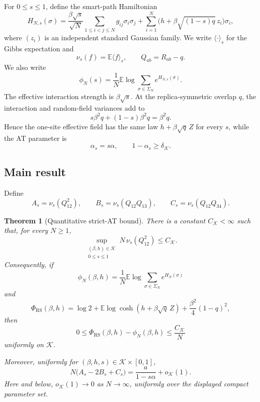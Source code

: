 \documentclass[11pt]{article}
\numberwithin{equation}{section}
\theoremstyle{plain}
\newtheorem{theorem}{Theorem}[section]
\theoremstyle{definition}
\newcommand{\E}{\mathbb E}
\newcommand{\1}{\mathbf 1}
\newcommand{\RS}{\mathrm{RS}}
\newcommand{\cK}{\mathcal K}
\begin{document}
For $0\le s\le1$, define the smart-path Hamiltonian
\begin{equation}
 H_{N,s}(\sigma)
 =
 \frac{\beta\sqrt s}{\sqrt N}
 \sum_{1\le i<j\le N}g_{ij}\sigma_i\sigma_j
 +\sum_{i=1}^N
 \bigl(h+\beta\sqrt{(1-s)q}\,z_i\bigr)\sigma_i,
 \label{eq:path}
\end{equation}
where $(z_i)$ is an independent standard Gaussian family.  We write
$\langle\cdot\rangle_s$ for the Gibbs expectation and
\[
 \nu_s(f)=\E\langle f\rangle_s,\qquad Q_{ab}=R_{ab}-q.
\]
We also write
\begin{equation}
 \phi_N(s)=\frac1N\E\log
 \sum_{\sigma\in\Sigma_N}e^{H_{N,s}(\sigma)}.
 \label{eq:pathfreeenergy}
\end{equation}
The effective interaction strength is $\beta\sqrt s$.  At the
replica-symmetric overlap $q$, the interaction and random-field
variances add to
\begin{equation}
 s\beta^2q+(1-s)\beta^2q=\beta^2q.
 \label{eq:constantvariance}
\end{equation}
Hence the one-site effective field has the same law
$h+\beta\sqrt q\,Z$ for every $s$, while the AT parameter is
\begin{equation}
 \alpha_s=s\alpha,\qquad 1-\alpha_s\ge\delta_{\cK}.
 \label{eq:alphas}
\end{equation}

\subsection{Main result}

Define
\begin{equation}
 A_s=\nu_s(Q_{12}^2),\qquad
 B_s=\nu_s(Q_{12}Q_{13}),\qquad
 C_s=\nu_s(Q_{12}Q_{34}).
 \label{eq:ABC}
\end{equation}

\begin{theorem}[Quantitative strict-AT bound]
\label{thm:main}
There is a constant $C_{\cK}<\infty$ such that, for every $N\ge1$,
\[
 \sup_{\substack{(\beta,h)\in\cK\\0\le s\le1}}
 N\,\nu_s(Q_{12}^2)\le C_{\cK}.
\]
Consequently, if
\[
 \phi_N(\beta,h)=\frac1N\E\log\sum_{\sigma\in\Sigma_N}e^{H_N(\sigma)}
\]
and
\[
 \Phi_{\RS}(\beta,h)
 =
 \log2+\E\log\cosh(h+\beta\sqrt q\,Z)
 +\frac{\beta^2}{4}(1-q)^2,
\]
then
\[
 0\le\Phi_{\RS}(\beta,h)-\phi_N(\beta,h)
 \le\frac{C_{\cK}}N
\]
uniformly on $\cK$.

Moreover, uniformly for $(\beta,h,s)\in\cK\times[0,1]$,
\[
 N\bigl(A_s-2B_s+C_s\bigr)
 =
 \frac{a}{1-s\alpha}+o_{\cK}(1).
\]
Here and below, $o_{\cK}(1)\to0$ as $N\to\infty$, uniformly over the
displayed compact parameter set.
\end{theorem}
\end{document}
